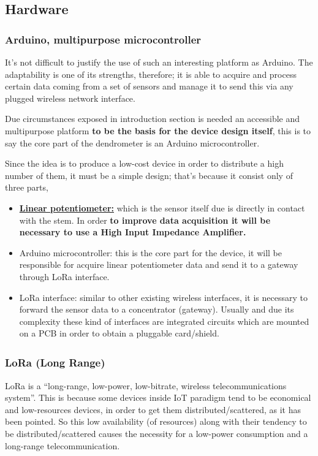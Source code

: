 \documentclass[11pt,a4paper,dvipsnames,twoside]{article}
\newcommand{\doubt}[1] {\textbf{\color{Red3}#1}}
\newcommand{\lang}[1] {\textbf{\color{Tomato1}#1}}
\begin{document}
\subsection{Hardware}

\subsubsection{Arduino, multipurpose microcontroller}
It's not difficult to justify the use of such an interesting platform as Arduino. The adaptability is one of its strengths, therefore; it is able to acquire and process certain data coming from a set of sensors and manage it to send this via any plugged wireless network interface.

Due circumstances exposed in introduction section is needed an accessible and multipurpose platform \lang{to be the basis for the device design itself}, this is to say the core part of the dendrometer is an Arduino microcontroller.  

Since the idea is to produce a low-cost device in order to distribute a high number of them, it must be a simple design; that's because it consist only of three parts,

\begin{itemize}
  \item \href{https://es.rs-online.com/web/p/products/0317780/}{\doubt{Linear potentiometer:}} which is the sensor itself due is directly in contact with the stem. In order \doubt{to improve data acquisition it will be necessary to use a High Input Impedance Amplifier.}
  \item Arduino microcontroller: this is the core part for the device, it will be responsible for acquire linear potentiometer data and send it to a gateway through LoRa interface. 
  \item LoRa interface: similar to other existing wireless interfaces, it is necessary to forward the sensor data to a concentrator (gateway). Usually and due its complexity these kind of interfaces are integrated circuits which are mounted on a PCB in order to obtain a pluggable card/shield. 
\end{itemize}

\subsubsection{\texorpdfstring{LoRa\textsuperscript{\textregistered} (Lo{\normalfont\sffamily ng} Ra{\normalfont\sffamily nge})}{LoRa® (Long Range)}}
LoRa is a \enquote{long-range, low-power, low-bitrate, wireless telecommunications system}\cite[]{LoRaGeneral}. This is because some devices inside IoT paradigm tend to be economical and low-resources devices, in order to get them distributed/scattered, as it has been pointed. So this low availability (of resources) along with their tendency to be distributed/scattered causes the necessity for a low-power consumption and a long-range telecommunication.
\end{document}
